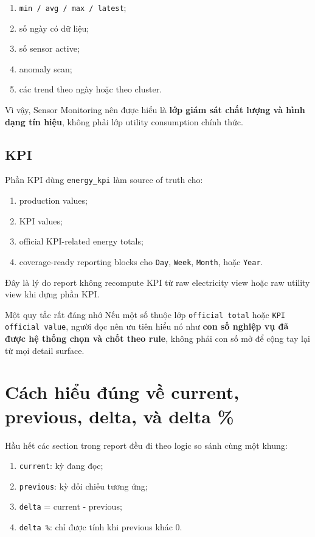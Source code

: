 \begin{enumerate}[label=-]
\item \texttt{min / avg / max / latest};
\item số ngày có dữ liệu;
\item số sensor active;
\item anomaly scan;
\item các trend theo ngày hoặc theo cluster.
\end{enumerate}

Vì vậy, Sensor Monitoring nên được hiểu là \textbf{lớp giám sát chất lượng và hình dạng tín hiệu}, không phải lớp utility consumption chính thức.

\subsection{KPI}

Phần KPI dùng \texttt{energy\_kpi} làm source of truth cho:

\begin{enumerate}[label=-]
\item production values;
\item KPI values;
\item official KPI-related energy totals;
\item coverage-ready reporting blocks cho \texttt{Day}, \texttt{Week}, \texttt{Month}, hoặc \texttt{Year}.
\end{enumerate}

Đây là lý do report không recompute KPI từ raw electricity view hoặc raw utility view khi dựng phần KPI.

\begin{ReaderNote}{Một quy tắc rất đáng nhớ}
Nếu một số thuộc lớp \texttt{official total} hoặc \texttt{KPI official value}, người đọc nên ưu tiên hiểu nó như \textbf{con số nghiệp vụ đã được hệ thống chọn và chốt theo rule}, không phải con số mở để cộng tay lại từ mọi detail surface.
\end{ReaderNote}

\section{Cách hiểu đúng về current, previous, delta, và delta \%}

Hầu hết các section trong report đều đi theo logic so sánh cùng một khung:

\begin{enumerate}[label=-]
\item \texttt{current}: kỳ đang đọc;
\item \texttt{previous}: kỳ đối chiếu tương ứng;
\item \texttt{delta} = current - previous;
\item \texttt{delta \%}: chỉ được tính khi previous khác 0.
\end{enumerate}

